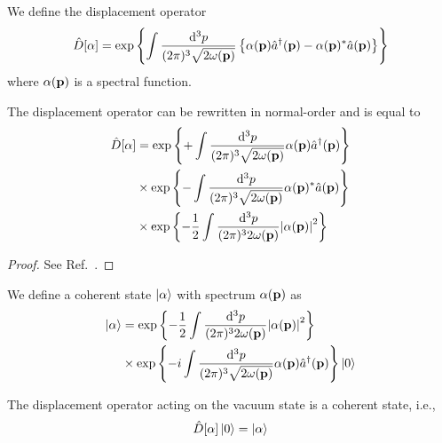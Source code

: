 \begin{definition}
	We define the displacement operator
	\begin{equation}
		\hat{D}[\alpha]
		=
		\exp\left\{
			\int\frac{\dd[3]{p}}{(2\pi)^3\sqrt{2\omega(\vb{p})}}
			\left\{
				\alpha(\vb{p})
				\hat{a}^\dagger(\vb{p})
				-
				\alpha(\vb{p})^*
				\hat{a}(\vb{p})
			\right\}
		\right\}
		\label{eq:displacement_operator}
	\end{equation}
	where $\alpha(\vb{p})$ is a spectral function.
\end{definition}
\begin{lemma}
	The displacement operator can be rewritten in normal-order and is equal to
	\begin{equation}
		\begin{split}
			\hat{D}[\alpha]
			&=
			\exp\left\{
				+
				\int\frac{\dd[3]{p}}{(2\pi)^3\sqrt{2\omega(\vb{p})}}
				\alpha(\vb{p})
				\hat{a}^\dagger(\vb{p})
			\right\}
			\\
			&\times
			\exp\left\{
				-
				\int\frac{\dd[3]{p}}{(2\pi)^3\sqrt{2\omega(\vb{p})}}
				\alpha(\vb{p})^*
				\hat{a}(\vb{p})
			\right\}
			\\
			&\times
			\exp\left\{
				-
				\frac{1}{2}
				\int\frac{\dd[3]{p}}{(2\pi)^32\omega(\vb{p})}
				\abs{\alpha(\vb{p})}^2
			\right\}
		\end{split}
		\label{eq:displacement_operator_normal}
	\end{equation}
\end{lemma}
\begin{proof}
	See Ref.~\cite[p.~48]{Barnett2002}.
\end{proof}
\begin{definition}
	We define a coherent state $\ket{\alpha}$ with spectrum $\alpha(\vb{p})$ as
	\begin{equation}
		\begin{split}
			\ket{\alpha}
			&=
			\exp\left\{
				-
				\frac{1}{2}
				\int\frac{\dd[3]{p}}{(2\pi)^32\omega(\vb{p})}
				\abs{\alpha(\vb{p})}^2
			\right\}
			\\
			&\times
			\exp\left\{
				-i
				\int\frac{\dd[3]{p}}{(2\pi)^3\sqrt{2\omega(\vb{p})}}
				\alpha(\vb{p})
				\hat{a}^\dagger(\vb{p})
			\right\}
			\ket{0}
		\end{split}
	\end{equation}
\end{definition}
\begin{lemma}
	The displacement operator acting on the vacuum state is a coherent state, i.e.,
	\begin{equation}
		\hat{D}[\alpha]
		\ket{0}
		=
		\ket{\alpha}
	\end{equation}
\end{lemma}
